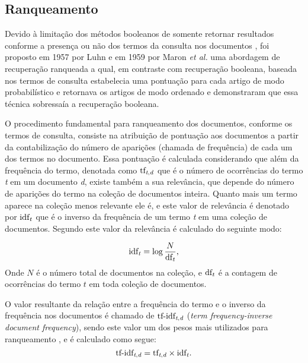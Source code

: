 \subsection{Ranqueamento} \label{subsec:Ranqueamento}
    Devido à limitação dos métodos booleanos de somente retornar resultados conforme a presença ou não dos termos da consulta nos documentos \cite[p.~100]{Manning2008IIR}, foi proposto em 1957 por Luhn e em 1959 por Maron \textit{et al.} uma abordagem de recuperação ranqueada \cite[p.~1446]{Sanderson2012THIRR} a qual, em contraste com recuperação booleana, baseada nos termos de consulta estabelecia uma pontuação para cada artigo de modo probabilístico e retornava os artigos de modo ordenado e demonstraram que essa técnica sobressaía a recuperação booleana.
    
    O procedimento fundamental para ranqueamento dos documentos, conforme os termos de consulta, consiste na atribuição de pontuação aos documentos a partir da contabilização do número de aparições (chamada de frequência) de cada um dos termos no documento.
    Essa pontuação é calculada considerando que além da frequência do termo, denotada como $\text{tf}_{\text{\textit{t},\textit{d}}}$ que é o número de ocorrências do termo \textit{t} em um documento \textit{d}, existe também a sua relevância, que depende do número de aparições do termo na coleção de documentos inteira.
    Quanto mais um termo aparece na coleção menos relevante ele é, e este valor de relevância é denotado por $\text{idf}_{\text{\textit{t}}}$ que é o inverso da frequência de um termo \textit{t} em uma coleção de documentos.
    Segundo  este valor da relevância é calculado do seguinte modo:

    \begin{equation}
        \label{eq:inverse-document-frequency}
        \text{idf}_{\text{\textit{t}}} = \log{\frac{N}{\text{df}_{\text{\textit{t}}}}},
    \end{equation}
    Onde $N$ é o número total de documentos na coleção, e $\text{df}_{\text{\textit{t}}}$ é a contagem de ocorrências do termo $t$ em toda coleção de documentos.
    
    O valor resultante da relação entre a frequência do termo e o inverso da frequência nos documentos é chamado de $\text{tf-idf}_{\text{\textit{t},\textit{d}}}$ (\textit{term frequency-inverse document frequency}), sendo este valor um dos pesos mais utilizados para ranqueamento \cite[p.~107--110]{Manning2008IIR}, e é calculado  como segue:
    \begin{equation}
        \label{eq:tf-idf}
        \text{tf-idf}_{\text{\textit{t},\textit{d}}}  = \text{tf}_{\text{\textit{t},\textit{d}}} \times \text{idf}_{\text{\textit{t}}}.
    \end{equation}
    
